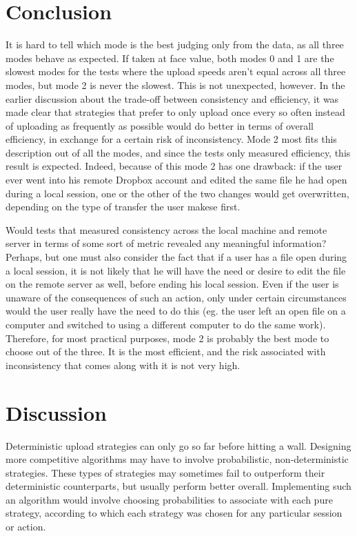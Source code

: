 \documentclass[pageno]{jpaper}
\begin{document}
\section{Conclusion}
It is hard to tell which mode is the best judging only from the data, as all three modes behave as expected. If taken at face value, both modes 0 and 1 are the slowest modes for the tests where the upload speeds aren't equal across all three modes, but mode 2 is never the slowest. This is not unexpected, however. In the earlier discussion about the trade-off between consistency and efficiency, it was made clear that strategies that prefer to only upload once every so often instead of uploading as frequently as possible would do better in terms of overall efficiency, in exchange for a certain risk of inconsistency. Mode 2 most fits this description out of all the modes, and since the tests only measured efficiency, this result is expected. Indeed, because of this mode 2 has one drawback: if the user ever went into his remote Dropbox account and edited the same file he had open during a local session, one or the other of the two changes would get overwritten, depending on the type of transfer the user makese first.

Would tests that measured consistency across the local machine and remote server in terms of some sort of metric revealed any meaningful information? Perhaps, but one must also consider the fact that if a user has a file open during a local session, it is not likely that he will have the need or desire to edit the file on the remote server as well, before ending his local session. Even if the user is unaware of the consequences of such an action, only under certain circumstances would the user really have the need to do this (eg. the user left an open file on a computer and switched to using a different computer to do the same work). Therefore, for most practical purposes, mode 2 is probably the best mode to choose out of the three. It is the most efficient, and the risk associated with inconsistency that comes along with it is not very high.

\section{Discussion}
Deterministic upload strategies can only go so far before hitting a wall. Designing more competitive algorithms may have to involve probabilistic, non-deterministic strategies. These types of strategies may sometimes fail to outperform their deterministic counterparts, but usually perform better overall. Implementing such an algorithm would involve choosing probabilities to associate with each pure strategy, according to which each strategy was chosen for any particular session or action.
\end{document}
